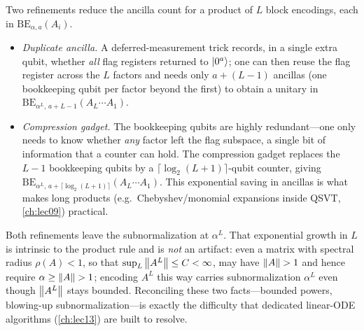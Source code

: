 \begin{remark}
\label{rem:lec07-compress}
Two refinements reduce the ancilla count for a product of $L$ block encodings, each
in $\mathrm{BE}_{\alpha,a}(A_i)$.
\begin{itemize}[leftmargin=1.4em,nosep]
  \item \emph{Duplicate ancilla.} A deferred-measurement trick records, in a single
        extra qubit, whether \emph{all} flag registers returned to $\ket{0^a}$; one
        can then reuse the flag register across the $L$ factors and needs only
        $a+(L-1)$ ancillas (one bookkeeping qubit per factor beyond the first) to
        obtain a unitary in $\mathrm{BE}_{\alpha^{L},\,a+L-1}(A_L\cdots A_1)$.
  \item \emph{Compression gadget.} The bookkeeping qubits are highly redundant---one
        only needs to know whether \emph{any} factor left the flag subspace, a single
        bit of information that a counter can hold. The compression gadget replaces
        the $L-1$ bookkeeping qubits by a $\lceil\log_2(L+1)\rceil$-qubit counter,
        giving $\mathrm{BE}_{\alpha^{L},\,a+\lceil\log_2(L+1)\rceil}(A_L\cdots A_1)$.
        This exponential saving in ancillas is what makes long products (e.g.\
        Chebyshev/monomial expansions inside QSVT, \cref{ch:lec09}) practical.
\end{itemize}
Both refinements leave the subnormalization at $\alpha^L$. That exponential growth in
$L$ is intrinsic to the product rule and is \emph{not} an artifact: even a matrix
with spectral radius $\rho(A)<1$, so that $\sup_L\left\lVert A^L \right\rVert\le C<\infty$, may have
$\left\lVert A \right\rVert>1$ and hence require $\alpha\ge\left\lVert A \right\rVert>1$; encoding $A^L$ this way carries
subnormalization $\alpha^L$ even though $\left\lVert A^L \right\rVert$ stays bounded. Reconciling these
two facts---bounded powers, blowing-up subnormalization---is exactly the difficulty
that dedicated linear-ODE algorithms (\cref{ch:lec13}) are built to resolve.
\end{remark}

